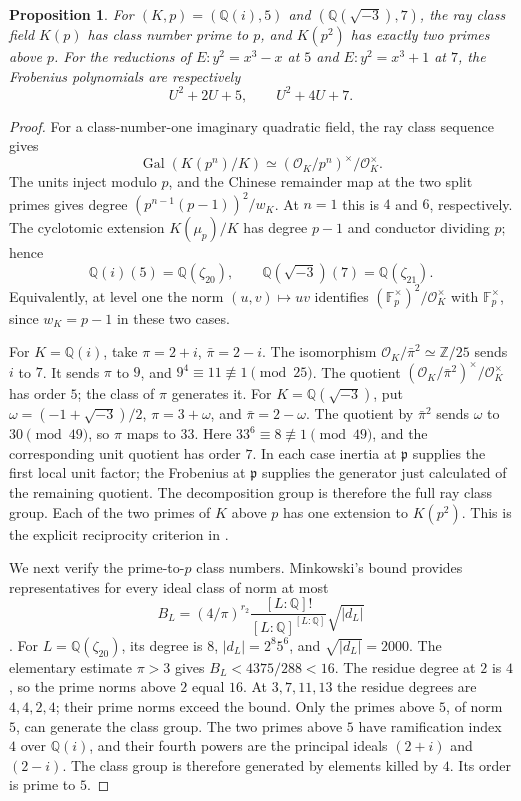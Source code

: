 \documentclass[11pt]{article}
\newtheorem{proposition}[theorem]{Proposition}
\theoremstyle{definition}\newtheorem{definition}[theorem]{Definition}
\begin{document}
\begin{proposition}\label{prop:cm-small-primes}
For \((K,p)=(\mathbb Q(i),5)\) and
\((\mathbb Q(\sqrt{-3}),7)\), the ray class field \(K(p)\) has
class number prime to \(p\), and \(K(p^2)\) has exactly two primes
above \(p\). For the reductions of
\(E:y^2=x^3-x\) at \(5\) and \(E:y^2=x^3+1\) at \(7\),
the Frobenius polynomials are respectively
\[
 U^2+2U+5,\qquad U^2+4U+7 .
\]
\end{proposition}
\begin{proof}
For a class-number-one imaginary quadratic field, the ray class
sequence gives
\[
 \operatorname{Gal}(K(p^n)/K)
  \simeq(\mathcal O_K/p^n)^\times/\mathcal O_K^\times .
\]
The units inject modulo \(p\), and the Chinese remainder map at
the two split primes gives degree
\((p^{n-1}(p-1))^2/w_K\).
At \(n=1\) this is \(4\) and \(6\), respectively.
The cyclotomic extension \(K(\mu_p)/K\) has degree \(p-1\) and
conductor dividing \(p\); hence
\[
 \mathbb Q(i)(5)=\mathbb Q(\zeta_{20}),\qquad
 \mathbb Q(\sqrt{-3})(7)=\mathbb Q(\zeta_{21}) .
\]
Equivalently, at level one the norm
\((u,v)\mapsto uv\) identifies
\((\mathbb F_p^\times)^2/\mathcal O_K^\times\)
with \(\mathbb F_p^\times\), since \(w_K=p-1\) in these two cases.

For \(K=\mathbb Q(i)\), take \(\pi=2+i\), \(\bar\pi=2-i\).
The isomorphism \(\mathcal O_K/\bar\pi^2\simeq\mathbb Z/25\)
sends \(i\) to \(7\). It sends \(\pi\) to \(9\), and
\(9^4\equiv11\not\equiv1\pmod {25}\).
The quotient
\((\mathcal O_K/\bar\pi^2)^\times/\mathcal O_K^\times\)
has order \(5\); the class of \(\pi\) generates it.
For \(K=\mathbb Q(\sqrt{-3})\), put
\(\omega=(-1+\sqrt{-3})/2\), \(\pi=3+\omega\), and
\(\bar\pi=2-\omega\). The quotient by \(\bar\pi^2\)
sends \(\omega\) to \(30\pmod {49}\), so \(\pi\) maps to \(33\).
Here \(33^6\equiv8\not\equiv1\pmod {49}\), and the corresponding
unit quotient has order \(7\).
In each case inertia at \(\mathfrak p\) supplies the first local
unit factor; the Frobenius at \(\mathfrak p\) supplies the generator
just calculated of the remaining quotient. The decomposition group
is therefore the full ray class group. Each of the two primes of
\(K\) above \(p\) has one extension to \(K(p^2)\).
This is the explicit reciprocity criterion in
\cite[Remark 2.14.1, p.~11]{Ishii}.

We next verify the prime-to-\(p\) class numbers. Minkowski's bound
provides representatives for every ideal class of norm at most
\[
 B_L=(4/\pi)^{r_2}\frac{[L:\mathbb Q]!}
 {[L:\mathbb Q]^{[L:\mathbb Q]}}\sqrt{|d_L|}
\]
\cite[Theorem 4.3, p.~70]{MilneANT}.
For \(L=\mathbb Q(\zeta_{20})\), its degree is \(8\),
\(|d_L|=2^8 5^6\), and \(\sqrt{|d_L|}=2000\).
The elementary estimate \(\pi>3\) gives
\(B_L<4375/288<16\).
The residue degree at \(2\) is \(4\), so the prime norms above
\(2\) equal \(16\). At \(3,7,11,13\) the residue degrees are
\(4,4,2,4\); their prime norms exceed the bound.
Only the primes above \(5\), of norm \(5\), can generate the
class group. The two primes above \(5\) have ramification index
\(4\) over \(\mathbb Q(i)\), and their fourth powers are the
principal ideals \((2+i)\) and \((2-i)\). The class group is
therefore generated by elements killed by \(4\).
Its order is prime to \(5\).


\end{proof}
\end{document}
